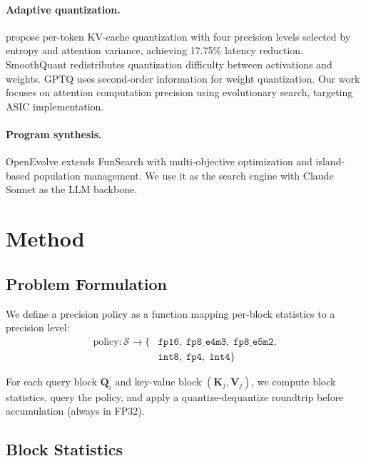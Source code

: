 \documentclass[10pt,twocolumn]{article}
\begin{document}
\paragraph{Adaptive quantization.}
\citet{boroujeni2026adaptive} propose per-token KV-cache quantization
with four precision levels selected by entropy and attention variance,
achieving 17.75\% latency reduction. SmoothQuant
\citep{xiao2023smoothquant} redistributes quantization difficulty between
activations and weights. GPTQ \citep{frantar2023gptq} uses second-order
information for weight quantization. Our work focuses on attention
computation precision using evolutionary search, targeting ASIC
implementation.

\paragraph{Program synthesis.}
OpenEvolve \citep{openevolve2025} extends FunSearch
\citep{romera2024funsearch} with multi-objective optimization and
island-based population management. We use it as the search engine with
Claude Sonnet as the LLM backbone.

\section{Method}

\subsection{Problem Formulation}

We define a precision policy as a function mapping per-block statistics
to a precision level:
\begin{align*}
\text{policy}: \mathcal{S} \rightarrow \{&\texttt{fp16},\;\texttt{fp8\_e4m3},\;\texttt{fp8\_e5m2},\\
                                         &\texttt{int8},\;\texttt{fp4},\;\texttt{int4}\}
\end{align*}

For each query block $\mathbf{Q}_i$ and key-value block
$(\mathbf{K}_j, \mathbf{V}_j)$, we compute block statistics, query the
policy, and apply a quantize-dequantize roundtrip before accumulation
(always in FP32).

\subsection{Block Statistics}
\end{document}
